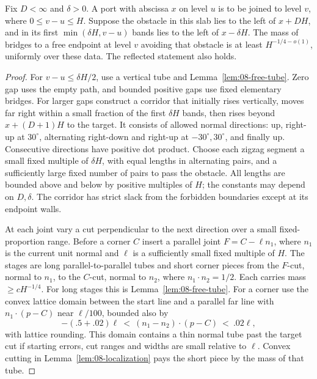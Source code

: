 \begin{lemma}\label{09_fast_paths:obstacle}
Fix \(D<\infty\) and \(\delta>0\).  A port with abscissa \(x\)
on level \(u\) is to be joined to level \(v\), where
\(0\le v-u\le H\).  Suppose the obstacle in this slab lies to the
left of \(x+DH\), and in its first \(\min(\delta H,v-u)\) bands
lies to the left of \(x-\delta H\).  The mass of bridges to a free
endpoint at level \(v\) avoiding that obstacle is at least
\(H^{-1/4-o(1)}\), uniformly over these data.  The reflected statement
also holds.
\end{lemma}
\begin{proof}
For \(v-u\le\delta H/2\), use a vertical tube and
Lemma~\ref{lem:08-free-tube}.  Zero gap uses the empty path, and bounded
positive gaps use fixed elementary bridges.  For larger gaps construct
a corridor that initially rises vertically, moves far right within a
small fraction of the first \(\delta H\) bands, then rises beyond
\(x+(D+1)H\) to the target.  It consists of allowed normal directions:
up, right-up at \(30^\circ\), alternating right-down and right-up at
\(-30^\circ,30^\circ\), and finally up.  Consecutive directions have
positive dot product.  Choose each zigzag segment a small fixed
multiple of \(\delta H\), with equal lengths in alternating pairs,
and a sufficiently large fixed number of pairs to pass the obstacle.
All lengths are bounded above and below by positive multiples of
\(H\); the constants may depend on \(D,\delta\).  The corridor has
strict slack from the forbidden boundaries except at its endpoint walls.

At each joint vary a cut perpendicular to the next direction over a
small fixed-proportion range.  Before a corner \(C\) insert a parallel
joint \(F=C-\ell n_1\), where \(n_1\) is the current unit normal
and \(\ell\) is a sufficiently small fixed multiple of \(H\).
The stages are long parallel-to-parallel tubes and short corner pieces
from the \(F\)-cut, normal to \(n_1\), to the \(C\)-cut, normal to
\(n_2\), where \(n_1\cdot n_2=1/2\).  Each carries mass
\(\ge cH^{-1/4}\).  For long stages this is
Lemma~\ref{lem:08-free-tube}.  For a corner use the convex lattice
domain between the start line and a parallel far line with
\(n_1\cdot(p-C)\) near \(\ell/100\), bounded also by
\[
       -(.5+.02)\ell\ <\ (n_1-n_2)\cdot(p-C)\ <\ .02\ell,
\]
with lattice rounding.  This domain contains a thin normal tube past
the target cut if starting errors, cut ranges and widths are small
relative to \(\ell\).  Convex cutting in
Lemma~\ref{lem:08-localization} pays the short piece by the mass of
that tube.


\end{proof}
